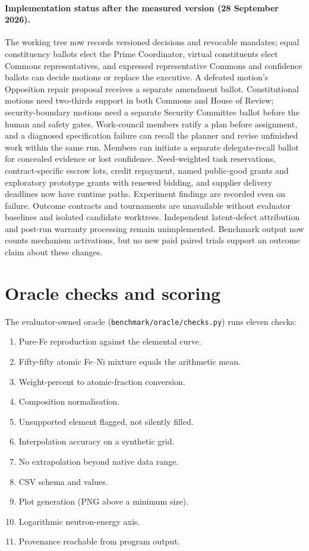 \documentclass[11pt,a4paper]{article}
\begin{document}
\paragraph{Implementation status after the measured version (28 September 2026).}
The working tree now records versioned decisions and revocable mandates; equal
constituency ballots elect the Prime Coordinator, virtual constituents elect Commons
representatives, and expressed representative Commons and confidence ballots can
decide motions or replace the executive. A defeated motion's Opposition repair proposal
receives a separate amendment ballot. Constitutional motions need two-thirds support
in both Commons and House of Review; security-boundary motions need a separate
Security Committee ballot before the human and safety gates.
Work-council members ratify a plan before assignment, and a diagnosed specification
failure can recall the planner and revise unfinished work within the same run. Members
can initiate a separate delegate-recall ballot for concealed evidence or lost confidence.
Need-weighted task reservations, contract-specific escrow lots, credit repayment, named public-good
grants and exploratory prototype grants with renewed bidding, and supplier delivery
deadlines now have runtime paths. Experiment findings are recorded even on failure.
Outcome contracts and tournaments are unavailable without evaluator baselines and
isolated candidate worktrees. Independent latent-defect attribution and post-run
warranty processing remain unimplemented. Benchmark output now counts mechanism activations, but no new paid
paired trials support an outcome claim about these changes.

\section{Oracle checks and scoring}
\label{app:oracle}

The evaluator-owned oracle (\texttt{benchmark/oracle/checks.py}) runs eleven checks:

\begin{enumerate}
\setlength{\itemsep}{0.15em}
\item Pure-Fe reproduction against the elemental curve.
\item Fifty-fifty atomic Fe--Ni mixture equals the arithmetic mean.
\item Weight-percent to atomic-fraction conversion.
\item Composition normalisation.
\item Unsupported element flagged, not silently filled.
\item Interpolation accuracy on a synthetic grid.
\item No extrapolation beyond native data range.
\item CSV schema and values.
\item Plot generation (PNG above a minimum size).
\item Logarithmic neutron-energy axis.
\item Provenance reachable from program output.
\end{enumerate}
\end{document}
